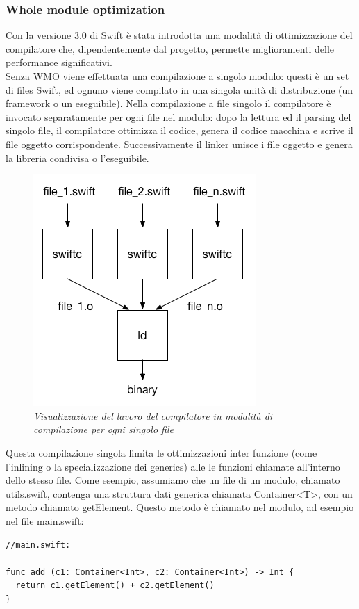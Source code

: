 \subsubsection{Whole module optimization}
Con la versione 3.0 di Swift è stata introdotta una modalità di ottimizzazione del compilatore che, dipendentemente dal progetto, permette miglioramenti delle performance significativi.\\
Senza WMO viene effettuata una compilazione a singolo modulo:
questi è un set di files Swift, ed ognuno viene compilato in una singola unità di distribuzione (un framework o un eseguibile). Nella compilazione a file singolo il compilatore è invocato separatamente per ogni file nel modulo: dopo la lettura ed il parsing del singolo file, il compilatore ottimizza il codice, genera il codice macchina e scrive il file oggetto corrispondente. Successivamente il linker unisce i file oggetto e genera la libreria condivisa o l'eseguibile.
\begin{figure}[H]
      \centering
      \includegraphics[scale=0.80]{immagini/single-file.png}
            \vspace{0.8cm}
            \caption{\textit{Visualizzazione del lavoro del compilatore in modalità di compilazione per ogni singolo file}}
\end{figure}
Questa compilazione singola limita le ottimizzazioni inter funzione (come l'inlining o la specializzazione dei generics) alle le funzioni chiamate all'interno dello stesso file. Come esempio, assumiamo che un file di un modulo, chiamato utils.swift, contenga una struttura dati generica chiamata Container<T>, con un metodo chiamato getElement. Questo metodo è chiamato nel modulo, ad esempio nel file main.swift:
\begin{lstlisting}
//main.swift:

func add (c1: Container<Int>, c2: Container<Int>) -> Int {
  return c1.getElement() + c2.getElement()
}
\end{lstlisting}
